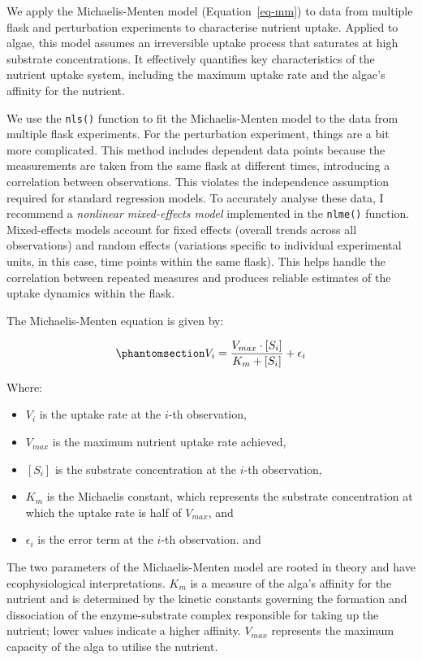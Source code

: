 \documentclass[
  letterpaper,
]{book}
\providecommand{\tightlist}{%
  \setlength{\itemsep}{0pt}\setlength{\parskip}{0pt}}\usepackage{longtable,booktabs,array}
\begin{document}
We apply the Michaelis-Menten model (Equation~\ref{eq-mm}) to data from
multiple flask and perturbation experiments to characterise nutrient
uptake. Applied to algae, this model assumes an irreversible uptake
process that saturates at high substrate concentrations. It effectively
quantifies key characteristics of the nutrient uptake system, including
the maximum uptake rate and the algae's affinity for the nutrient.

We use the \texttt{nls()} function to fit the Michaelis-Menten model to
the data from multiple flask experiments. For the perturbation
experiment, things are a bit more complicated. This method includes
dependent data points because the measurements are taken from the same
flask at different times, introducing a correlation between
observations. This violates the independence assumption required for
standard regression models. To accurately analyse these data, I
recommend a \emph{nonlinear mixed-effects model} implemented in the
\texttt{nlme()} function. Mixed-effects models account for fixed effects
(overall trends across all observations) and random effects (variations
specific to individual experimental units, in this case, time points
within the same flask). This helps handle the correlation between
repeated measures and produces reliable estimates of the uptake dynamics
within the flask.

The Michaelis-Menten equation is given by:

\begin{equation}\phantomsection\label{eq-mm}{V_i = \frac{V_{max} \cdot [S_i]}{K_m + [S_i]} + \epsilon_i}\end{equation}

Where:

\begin{itemize}
\tightlist
\item
  \(V_i\) is the uptake rate at the \(i\)-th observation,
\item
  \(V_{max}\) is the maximum nutrient uptake rate achieved,
\item
  \([S_i]\) is the substrate concentration at the \(i\)-th observation,
\item
  \(K_m\) is the Michaelis constant, which represents the substrate
  concentration at which the uptake rate is half of \(V_{max}\), and
\item
  \(\epsilon_i\) is the error term at the \(i\)-th observation. and
\end{itemize}

The two parameters of the Michaelis-Menten model are rooted in theory
and have ecophysiological interpretations. \(K_m\) is a measure of the
alga's affinity for the nutrient and is determined by the kinetic
constants governing the formation and dissociation of the
enzyme-substrate complex responsible for taking up the nutrient; lower
values indicate a higher affinity. \(V_{max}\) represents the maximum
capacity of the alga to utilise the nutrient.
\end{document}
